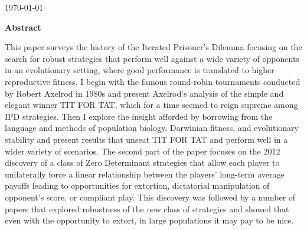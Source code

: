 \documentclass[12pt,oneside]{book}
\theoremstyle{plain} %
\theoremstyle{definition}  %
\theoremstyle{remark}  %
\begin{document}
\thispagestyle{empty}


\begin{center}
{\Large \bf \mytitle}

\vspace{.3in}

{\large \myname}

\vspace{.3in}

\today

\end{center}

\vspace{.6in}

\begin{center}
{\large \bf Abstract}
\end{center}
This paper surveys the history of the Iterated Prisoner's Dilemma focusing on the search for robust strategies that perform well against a wide variety of opponents in an evolutionary setting, where good performance is translated to higher reproductive fitness. I begin with the famous round-robin tournaments conducted by Robert Axelrod in 1980s and present Axelrod's analysis of the simple and elegant winner TIT FOR TAT, which for a time seemed to reign supreme among IPD strategies. Then I explore the insight afforded by borrowing from the language and methods of population biology, Darwinian fitness, and evolutionary stability and present results that unseat TIT FOR TAT and perform well in a wider variety of scenarios. The second part of the paper focuses on the 2012 discovery of a class of Zero Determinant strategies that allow each player to unilaterally force a linear relationship between the players' long-term average payoffs leading to opportunities for extortion, dictatorial manipulation of opponent's score, or compliant play. This discovery was followed by a number of papers that explored robustness of the new class of strategies and showed that even with the opportunity to extort, in large populations it may pay to be nice.
\newpage
\tableofcontents
\end{document}
